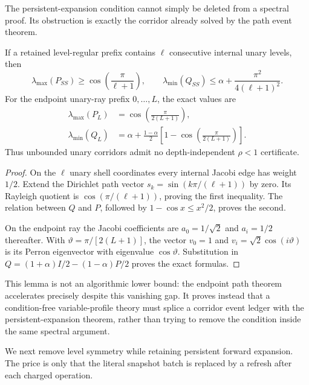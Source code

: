 The persistent-expansion condition cannot simply be deleted from a spectral
proof.  Its obstruction is exactly the corridor already solved by the path
event theorem.

\begin{lemma}
\label{lem:direct-unary-corridor-gap-obstruction}
If a retained level-regular prefix contains $\ell$ consecutive internal
unary levels, then
\begin{equation}
 \lambda_{\max}(P_{SS})\geq\cos\!\left(\frac{\pi}{\ell+1}\right),
 \qquad
 \lambda_{\min}(Q_{SS})
 \leq\alpha+\frac{\pi^2}{4(\ell+1)^2}.
 \label{eq:direct-unary-corridor-gap-obstruction}
\end{equation}
For the endpoint unary-ray prefix $0,\ldots,L$, the exact values are
\begin{align}
 \lambda_{\max}(P_L)
 &=\cos\!\left(\frac{\pi}{2(L+1)}\right),
 \label{eq:direct-unary-ray-perron}\\
 \lambda_{\min}(Q_L)
 &=\alpha+\frac{1-\alpha}{2}
 \left[1-\cos\!\left(\frac{\pi}{2(L+1)}\right)\right].
 \label{eq:direct-unary-ray-gap}
\end{align}
Thus unbounded unary corridors admit no depth-independent
$\rho<1$ certificate.
\end{lemma}

\begin{proof}
On the $\ell$ unary shell coordinates every internal Jacobi edge has weight
$1/2$.  Extend the Dirichlet path vector
$s_k=\sin(k\pi/(\ell+1))$ by zero.  Its Rayleigh quotient is
$\cos(\pi/(\ell+1))$, proving the first inequality.  The relation between
$Q$ and $P$, followed by $1-\cos x\leq x^2/2$, proves the second.

On the endpoint ray the Jacobi coefficients are $a_0=1/\sqrt2$ and
$a_i=1/2$ thereafter.  With
$\vartheta=\pi/[2(L+1)]$, the vector
$v_0=1$ and $v_i=\sqrt2\cos(i\vartheta)$ is its Perron eigenvector with
eigenvalue $\cos\vartheta$.  Substitution in
$Q=(1+\alpha)I/2-(1-\alpha)P/2$ proves the exact formulas.
\end{proof}

This lemma is not an algorithmic lower bound: the endpoint path theorem
accelerates precisely despite this vanishing gap.  It proves instead that a
condition-free variable-profile theory must splice a corridor event ledger
with the persistent-expansion theorem, rather than trying to remove the
condition inside the same spectral argument.

We next remove level symmetry while retaining persistent forward expansion.
The price is only that the literal snapshot batch is replaced by a refresh
after each charged operation.

